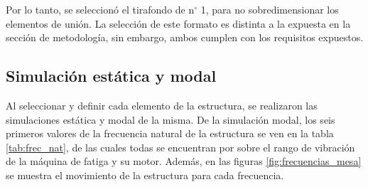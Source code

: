 \begin{table}[h]
\centering
\caption{Esfuerzos admisibles y factor de seguridad para distintas longitudes de tirafondo.}
\label{tab:res_tirafondos}
\end{table}

Por lo tanto, se seleccionó el tirafondo de n$^{\circ}$ 1, para no sobredimensionar los elementos de unión. La selección de este formato es distinta a la expuesta en la sección de metodología, sin embargo, ambos cumplen con los requisitos expuestos. 


\subsection{Simulación estática y modal}

Al seleccionar y definir cada elemento de la estructura, se realizaron las simulaciones estática y modal de la misma. De la simulación modal, los seis primeros valores de la frecuencia natural de la estructura se ven en la tabla \ref{tab:frec_nat}, de las cuales todas se encuentran por sobre el rango de vibración de la máquina de fatiga y su motor. Además, en las figuras \ref{fig:frecuencias_mesa} se muestra el movimiento de la estructura para cada frecuencia.

